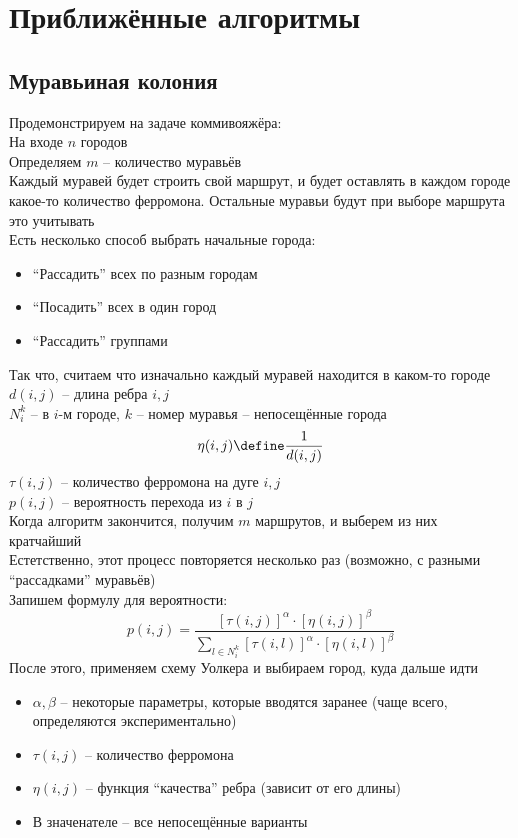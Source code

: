 \section{Приближённые алгоритмы}

\subsection{Муравьиная колония}

Продемонстрируем на задаче коммивояжёра: \\
На входе $ n $ городов \\
Определяем $ m $ -- количество муравьёв \\
Каждый муравей будет строить свой маршрут, и будет оставлять в каждом городе какое-то количество ферромона. Остальные муравьи будут при выборе маршрута это учитывать \\
Есть несколько способ выбрать начальные города:
\begin{itemize}
	\item ``Рассадить'' всех по разным городам
    \item ``Посадить'' всех в один город
    \item ``Рассадить'' группами
\end{itemize}
Так что, считаем что изначально каждый муравей находится в каком-то городе \\
$ d(i, j) $ -- длина ребра $ i, j $ \\
$ N_i^k $ -- в $ i $-м городе, $ k $ -- номер муравья -- непосещённые города
$$ \eta(i, j) \define \frac1{d(i, j)} $$
$ \tau(i, j) $ -- количество ферромона на дуге $ i, j $ \\
$ p(i, j) $ -- вероятность перехода из $ i $ в $ j $ \\
Когда алгоритм закончится, получим $ m $ маршрутов, и выберем из них кратчайший \\
Естетственно, этот процесс повторяется несколько раз (возможно, с разными ``рассадками'' муравьёв) \\
Запишем формулу для вероятности:
$$ p(i, j) = \frac{[\tau(i, j)]^\alpha \cdot [\eta(i, j)]^\beta}{\sum_{l \in N_i^k} [\tau(i, l)]^\alpha \cdot [\eta(i, l)]^\beta} $$
После этого, применяем схему Уолкера и выбираем город, куда дальше идти
\begin{itemize}
	\item $ \alpha, \beta $ -- некоторые параметры, которые вводятся заранее (чаще всего, определяются экспериментально)
    \item $ \tau(i, j) $ -- количество ферромона
    \item $ \eta(i, j) $ -- функция ``качества'' ребра (зависит от его длины)
    \item В значенателе -- все непосещённые варианты
\end{itemize}


